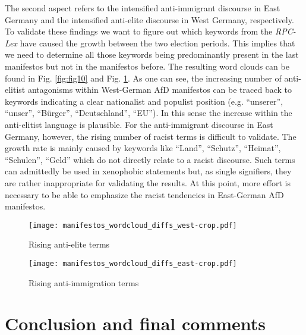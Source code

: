 \documentclass[a4paper]{scrreprt}
\begin{document}
The second aspect refers to the intensified anti-immigrant discourse in East Germany and the intensified anti-elite discourse in West Germany, respectively. To validate these findings we want to figure out which keywords from the {\em RPC-Lex} have caused the growth between the two election periods. This implies that we need to determine all those keywords being predominantly present in the last manifestos but not in the manifestos before. The resulting word clouds can be found in Fig. \ref{fig:fig10} and Fig. \ref{fig:fig11}. As one can see, the increasing number of anti-elitist antagonisms within West-German AfD manifestos can be traced back to keywords indicating a clear nationalist and populist position (e.g. ``unserer'', ``unser'', ``Bürger'', ``Deutschland'', ``EU''). In this sense the increase within the anti-elitist language is plausible. For the anti-immigrant discourse in East Germany, however, the rising number of racist terms is difficult to validate. The growth rate is mainly caused by keywords like ``Land'', ``Schutz'', ``Heimat'', ``Schulen'', ``Geld'' which do not directly relate to a racist discourse. Such terms can admittedly be used in xenophobic statements but, as single signifiers, they are rather inappropriate for validating the results. At this point, more effort is necessary to be able to emphasize the racist tendencies in East-German AfD manifestos. 
\begin{figure}
    \centering
    \begin{minipage}{.5\textwidth}
        \centering
        \texttt{[image: manifestos\_wordcloud\_diffs\_west-crop.pdf]}
        \caption{Rising anti-elite terms}
        \label{fig:fig10}
    \end{minipage}%
    \begin{minipage}{.5\textwidth}
        \centering
        \texttt{[image: manifestos\_wordcloud\_diffs\_east-crop.pdf]}
        \caption{Rising anti-immigration terms}
        \label{fig:fig11}
    \end{minipage}
\end{figure}
\chapter{Conclusion and final comments}


\end{document}
